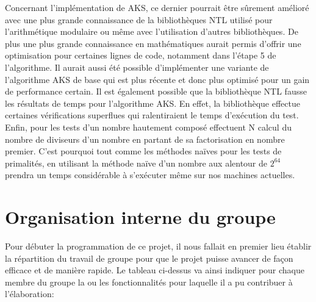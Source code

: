 		Concernant l'implémentation de AKS, ce dernier pourrait être sûrement amélioré avec une plus grande connaissance de la bibliothèques NTL utilisé pour l'arithmétique modulaire ou même avec l'utilisation d'autres bibliothèques. De plus une plus grande connaissance en mathématiques aurait permis d'offrir une optimisation pour certaines lignes de code, notamment dans l'étape 5 de l’algorithme. Il aurait aussi été possible d'implémenter une variante de l’algorithme AKS de base qui est plus récente et donc plus optimisé pour un gain de performance certain.
Il est également possible que la bibliothèque NTL fausse les résultats de temps pour l'algorithme AKS. En effet, la bibliothèque effectue certaines vérifications superflues qui ralentiraient le temps d’exécution du test.\\
		
		Enfin, pour les tests d'un nombre hautement composé effectuent N calcul du nombre de diviseurs d'un nombre en partant de sa factorisation en nombre premier. C'est pourquoi tout comme les méthodes naïves pour les tests de primalités, en utilisant la méthode naïve d'un nombre aux alentour de $2^{64}$ prendra un temps considérable à s’exécuter même sur nos machines actuelles.
					
	\section{Organisation interne du groupe}
	Pour débuter la programmation de ce projet, il nous fallait en premier lieu établir la répartition du travail de groupe pour que le projet puisse avancer de façon efficace et de manière rapide. Le tableau ci-dessus va ainsi indiquer pour chaque membre du groupe la ou les fonctionnalités pour laquelle il a pu contribuer à l'élaboration: \\
	
